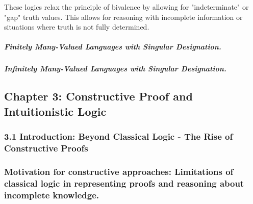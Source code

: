 These logics relax the principle of bivalence by allowing for
"indeterminate" or "gap" truth values. This allows for reasoning with
incomplete information or situations where truth is not fully
determined.

\hypertarget{finitely-many-valued-languages-with-singular-designation.}{%
\subparagraph*{Finitely Many-Valued Languages with Singular
Designation.}\label{finitely-many-valued-languages-with-singular-designation.}}

\hypertarget{infinitely-many-valued-languages-with-singular-designation.}{%
\subparagraph*{Infinitely Many-Valued Languages with Singular
Designation.}\label{infinitely-many-valued-languages-with-singular-designation.}}

\hypertarget{chapter-3-constructive-proof-and-intuitionistic-logic}{%
\subsection*{Chapter 3: Constructive Proof and Intuitionistic
Logic}\label{chapter-3-constructive-proof-and-intuitionistic-logic}}

\hypertarget{introduction-beyond-classical-logic---the-rise-of-constructive-proofs}{%
\subsubsection*{\texorpdfstring{\textbf{3.1 Introduction: Beyond
Classical Logic - The Rise of Constructive
Proofs}}{3.1 Introduction: Beyond Classical Logic - The Rise of Constructive Proofs}}\label{introduction-beyond-classical-logic---the-rise-of-constructive-proofs}}

\hypertarget{motivation-for-constructive-approaches-limitations-of-classical-logic-in-representing-proofs-and-reasoning-about-incomplete-knowledge.}{%
\subsubsection{Motivation for constructive approaches: Limitations of
classical logic in representing proofs and reasoning about incomplete
knowledge.}\label{motivation-for-constructive-approaches-limitations-of-classical-logic-in-representing-proofs-and-reasoning-about-incomplete-knowledge.}}

